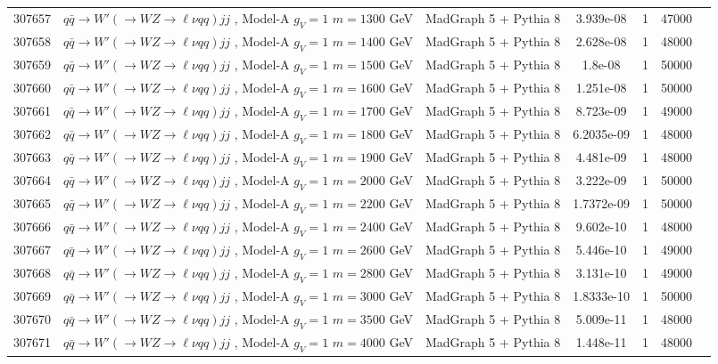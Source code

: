 \begin{landscape}
\begin{table}[!htb]
\begin{footnotesize}
\begin{center}
\begin{tabular}{c|l|c|c|c|cr}
	307657 & $q\bar{q} \to W'\left(\to WZ \to \ell\nu qq\right) jj$ , Model-A $g_V=1$ $m=1300$ GeV& MadGraph 5 + Pythia 8 & 3.939e-08 & 1  & 47000 \\
	307658 & $q\bar{q} \to W'\left(\to WZ \to \ell\nu qq\right) jj$ , Model-A $g_V=1$ $m=1400$ GeV& MadGraph 5 + Pythia 8 & 2.628e-08 &  1 & 48000 \\
	307659 & $q\bar{q} \to W'\left(\to WZ \to \ell\nu qq\right) jj$ , Model-A $g_V=1$ $m=1500$ GeV& MadGraph 5 + Pythia 8 & 1.8e-08 & 1  & 50000 \\
	307660 & $q\bar{q} \to W'\left(\to WZ \to \ell\nu qq\right) jj$ , Model-A $g_V=1$ $m=1600$ GeV& MadGraph 5 + Pythia 8 & 1.251e-08 & 1  & 50000 \\
	307661 & $q\bar{q} \to W'\left(\to WZ \to \ell\nu qq\right) jj$ , Model-A $g_V=1$ $m=1700$ GeV& MadGraph 5 + Pythia 8 & 8.723e-09 & 1  & 49000 \\
	307662 & $q\bar{q} \to W'\left(\to WZ \to \ell\nu qq\right) jj$ , Model-A $g_V=1$ $m=1800$ GeV& MadGraph 5 + Pythia 8 & 6.2035e-09 & 1  & 48000 \\
	307663 & $q\bar{q} \to W'\left(\to WZ \to \ell\nu qq\right) jj$ , Model-A $g_V=1$ $m=1900$ GeV& MadGraph 5 + Pythia 8 & 4.481e-09 & 1  & 48000 \\
	307664 & $q\bar{q} \to W'\left(\to WZ \to \ell\nu qq\right) jj$ , Model-A $g_V=1$ $m=2000$ GeV& MadGraph 5 + Pythia 8 & 3.222e-09 & 1  & 50000 \\
	307665 & $q\bar{q} \to W'\left(\to WZ \to \ell\nu qq\right) jj$ , Model-A $g_V=1$ $m=2200$ GeV& MadGraph 5 + Pythia 8 & 1.7372e-09 & 1  & 50000 \\
	307666 & $q\bar{q} \to W'\left(\to WZ \to \ell\nu qq\right) jj$ , Model-A $g_V=1$ $m=2400$ GeV& MadGraph 5 + Pythia 8 & 9.602e-10 & 1  & 48000 \\
	307667 & $q\bar{q} \to W'\left(\to WZ \to \ell\nu qq\right) jj$ , Model-A $g_V=1$ $m=2600$ GeV& MadGraph 5 + Pythia 8 & 5.446e-10 & 1  & 49000 \\
	307668 & $q\bar{q} \to W'\left(\to WZ \to \ell\nu qq\right) jj$ , Model-A $g_V=1$ $m=2800$ GeV& MadGraph 5 + Pythia 8 & 3.131e-10 & 1  & 49000 \\
	307669 & $q\bar{q} \to W'\left(\to WZ \to \ell\nu qq\right) jj$ , Model-A $g_V=1$ $m=3000$ GeV& MadGraph 5 + Pythia 8 & 1.8333e-10 & 1  & 50000 \\
	307670 & $q\bar{q} \to W'\left(\to WZ \to \ell\nu qq\right) jj$ , Model-A $g_V=1$ $m=3500$ GeV& MadGraph 5 + Pythia 8 & 5.009e-11 & 1  & 48000 \\
	307671 & $q\bar{q} \to W'\left(\to WZ \to \ell\nu qq\right) jj$ , Model-A $g_V=1$ $m=4000$ GeV& MadGraph 5 + Pythia 8 & 1.448e-11 & 1  & 48000 \\
\hline\hline
\end{tabular}
\end{center}
\end{footnotesize}
\end{table}


\end{landscape}
